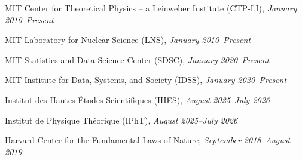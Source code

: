 \bbl
\item MIT Center for Theoretical Physics -- a Leinweber Institute (CTP-LI), \emph{January 2010--Present}
\item MIT Laboratory for Nuclear Science (LNS), \emph{January 2010--Present}
\item MIT Statistics and Data Science Center (SDSC), \emph{January 2020--Present}
\item MIT Institute for Data, Systems, and Society (IDSS), \emph{January 2020--Present}
\item Institut des Hautes Études Scientifiques (IHES), \emph{August 2025--July 2026}
\item Institut de Physique Théorique (IPhT), \emph{August 2025--July 2026}
\item Harvard Center for the Fundamental Laws of Nature, \emph{September 2018--August 2019}
\el
